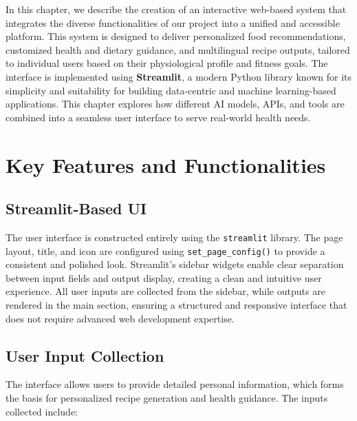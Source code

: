\documentclass[letterpaper,11pt]{report}
\begin{document}
In this chapter, we describe the creation of an interactive web-based system that integrates the diverse functionalities of our project into a unified and accessible platform. This system is designed to deliver personalized food recommendations, customized health and dietary guidance, and multilingual recipe outputs, tailored to individual users based on their physiological profile and fitness goals. The interface is implemented using \textbf{Streamlit}, a modern Python library known for its simplicity and suitability for building data-centric and machine learning-based applications. This chapter explores how different AI models, APIs, and tools are combined into a seamless user interface to serve real-world health needs.

\section{Key Features and Functionalities}

\subsection{Streamlit-Based UI}

The user interface is constructed entirely using the \texttt{streamlit} library. The page layout, title, and icon are configured using \texttt{set\_page\_config()} to provide a consistent and polished look. Streamlit's sidebar widgets enable clear separation between input fields and output display, creating a clean and intuitive user experience. All user inputs are collected from the sidebar, while outputs are rendered in the main section, ensuring a structured and responsive interface that does not require advanced web development expertise.

\subsection{User Input Collection}

The interface allows users to provide detailed personal information, which forms the basis for personalized recipe generation and health guidance. The inputs collected include:
\end{document}
